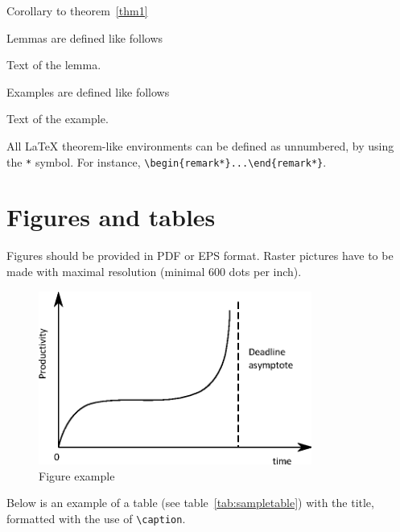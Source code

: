 \documentclass[11pt]{article}
\begin{document}
\begin{coroll}
Corollary to theorem~\ref{thm1}
\end{coroll}

Lemmas are defined like follows
\begin{lem}\label{lem1}
Text of the lemma.
\end{lem}

Examples are defined like follows
\begin{example}
Text of the example.
\end{example}

\begin{remark*}
All \LaTeX{} theorem-like environments can be defined as unnumbered, by using the \verb"*"  symbol. For instance, \verb"\begin{remark*}...\end{remark*}".
\end{remark*}

\section{Figures and tables}

Figures should be provided in PDF or EPS format. Raster pictures have
to be made with maximal resolution (minimal 600 dots per inch).

\begin{figure}[ht!]
   \centering
     \includegraphics[width=0.8\textwidth]{funny_graph_en}
    \caption {Figure example}
\label{fig:example_graph}
\end{figure}

Below is an example of a table (see table~\ref{tab:sampletable}) with the title, formatted with the use of \verb"\caption".
\end{document}
